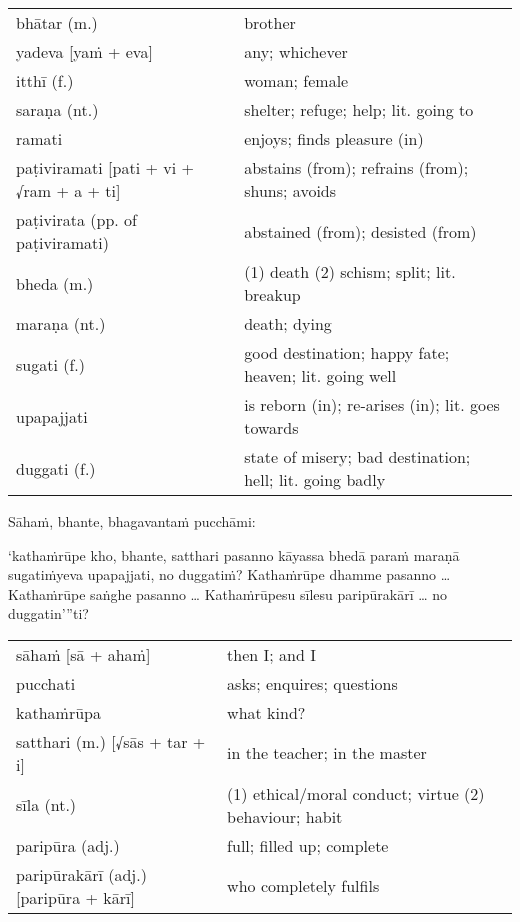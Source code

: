 \documentclass[11pt,oneside]{memoir}
\begin{document}
\begin{longtable}{L{\colOne} L{\colTwo}}
bhātar (m.) & brother\\[0pt]
yadeva [yaṁ + eva] & any; whichever\\[0pt]
itthī (f.) & woman; female\\[0pt]
saraṇa (nt.) & shelter; refuge; help; lit. going to\\[0pt]
ramati & enjoys; finds pleasure (in)\\[0pt]
paṭiviramati [pati + vi + √ram + a + ti] & abstains (from); refrains (from); shuns; avoids\\[0pt]
paṭivirata (pp. of paṭiviramati) & abstained (from); desisted (from)\\[0pt]
bheda (m.) & (1) death (2) schism; split; lit. breakup\\[0pt]
maraṇa (nt.) & death; dying\\[0pt]
sugati (f.) & good destination; happy fate; heaven; lit. going well\\[0pt]
upapajjati & is reborn (in); re-arises (in); lit. goes towards\\[0pt]
duggati (f.) & state of misery; bad destination; hell; lit. going badly\\[0pt]
\end{longtable}

\clearpage

\begin{spacedquote}
Sāhaṁ, bhante, bhagavantaṁ pucchāmi:

‘kathaṁrūpe kho, bhante, satthari pasanno
kāyassa bhedā paraṁ maraṇā sugatiṁyeva upapajjati, no duggatiṁ?
Kathaṁrūpe dhamme pasanno \ldots{}
Kathaṁrūpe saṅghe pasanno \ldots{}
Kathaṁrūpesu sīlesu paripūrakārī \ldots{} no duggatin’”ti?
\end{spacedquote}

\begin{longtable}{L{\colOne} L{\colTwo}}
sāhaṁ [sā + ahaṁ] & then I; and I\\[0pt]
pucchati & asks; enquires; questions\\[0pt]
kathaṁrūpa & what kind?\\[0pt]
satthari (m.) [√sās + tar + i] & in the teacher; in the master\\[0pt]
sīla (nt.) & (1) ethical/moral conduct; virtue (2) behaviour; habit\\[0pt]
paripūra (adj.) & full; filled up; complete\\[0pt]
paripūrakārī (adj.) [paripūra + kārī] & who completely fulfils\\[0pt]
\end{longtable}
\end{document}

